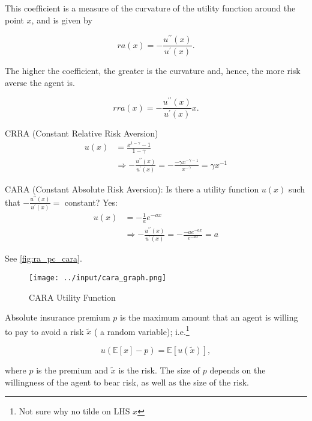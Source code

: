 \documentclass[10pt]{article}
\begin{document}
\begin{definition} 
    This coefficient is a measure of the curvature of the utility function around the point $x$, and is given by
    
    $$
    r a(x)=-\frac{u^{\prime \prime}(x)}{u^{\prime}(x)} .
    $$

    The higher the coefficient, the greater is the curvature and, hence, the more risk averse the agent is.
        
\end{definition}

\begin{definition}
    
    $$
    r r a(x)=-\frac{u^{\prime \prime}(x)}{u^{\prime}(x)} x .
    $$
 
\end{definition}

\begin{example}
    CRRA (Constant Relative Risk Aversion)
    $$
    \begin{aligned}
    u(x) & =\frac{x^{1-\gamma}-1}{1-\gamma} \\
    & \Rightarrow-\frac{u^{\prime \prime}(x)}{u^{\prime}(x)}=-\frac{-\gamma x^{-\gamma-1}}{x^{-\gamma}}=\gamma x^{-1}
    \end{aligned}
    $$
\end{example}

\begin{example}
    CARA (Constant Absolute Risk Aversion):
    Is there a utility function $u(x)$ such that $-\frac{u^{\prime \prime}(x)}{u^{\prime}(x)}=$ constant?
    Yes:
    $$
    \begin{aligned}
    u(x) & =-\frac{1}{a} e^{-a x} \\
    & \Rightarrow-\frac{u^{\prime \prime}(x)}{u^{\prime}(x)}=-\frac{-a e^{-a x}}{e^{-a x}}=a
    \end{aligned}
    $$

    See \autoref{fig:ra_pc_cara}.

\begin{figure}[!htb]
    \centering
        \texttt{[image: ../input/cara\_graph.png]}
    \caption{CARA Utility Function}
    \label{fig:ra_pc_cara}
\end{figure}

\end{example}

\begin{definition} 
     

    Absolute insurance premium $p$ is the maximum amount that an agent is willing to pay to avoid a risk $\tilde{x}$ ( a random variable); i.e.\footnote{
        \color{red} Not sure why no tilde on LHS $x$
    }
    
    $$
    u(\mathbb{E}[x]-p)=\mathbb{E}[u(\tilde{x})],
    $$
    
    where $p$ is the premium and $\tilde{x}$ is the risk. The size of $p$ depends on the willingness of the agent to bear risk, as well as the size of the risk.

\end{definition}
\end{document}
